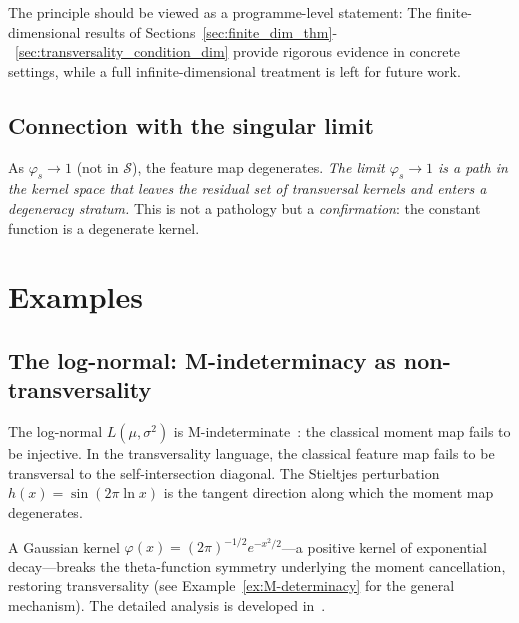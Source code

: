 \documentclass[11pt,a4paper]{article}
\newcommand{\cS}{\mathcal{S}}
\begin{document}
\noindent
The principle should be viewed as a programme-level statement:
The finite-dimensional results of Sections~\ref{sec:finite_dim_thm}-~\ref{sec:transversality_condition_dim} 
provide rigorous evidence in concrete settings, while a full infinite-dimensional treatment is left
for future work.

\subsection{Connection with the singular limit}

As $\varphi_s\to 1$ (not in $\cS$), the feature map degenerates.
\emph{The limit $\varphi_s\to 1$ is a path in the kernel space that
leaves the residual set of transversal kernels and enters a degeneracy
stratum.}  This is not a pathology but a \emph{confirmation}: the
constant function is a degenerate kernel.


\section{Examples}
\label{sec:examples}

\subsection{The log-normal: M-indeterminacy as non-transversality}

The log-normal $L(\mu,\sigma^2)$ is M-indeterminate~\cite{Stoyanov2000}:
the classical moment map fails to be injective.  In the transversality
language, the classical feature map fails to be transversal to the
self-intersection diagonal.  The Stieltjes perturbation
$h(x)=\sin(2\pi\ln x)$ is the tangent direction along which the
moment map degenerates.

A Gaussian kernel $\varphi(x)=(2\pi)^{-1/2}e^{-x^2/2}$---a positive
kernel of exponential decay---breaks the theta-function symmetry
underlying the moment cancellation, restoring transversality (see
Example~\ref{ex:M-determinacy} for the general mechanism).  The
detailed analysis is developed in~\cite{D}.
\end{document}
